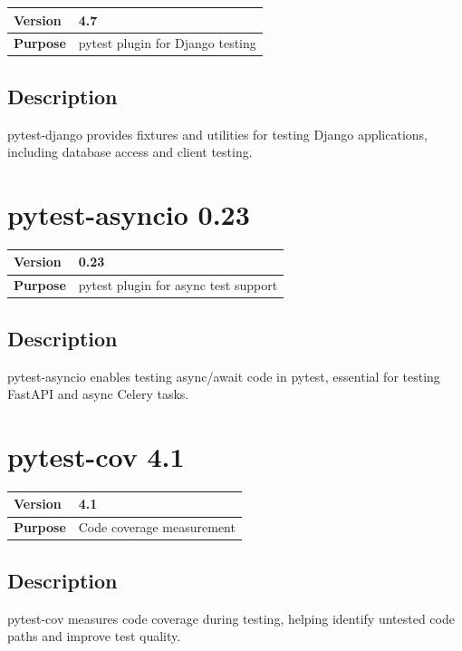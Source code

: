 \documentclass[12pt,a4paper]{report}
\begin{document}
\begin{tabular}{|p{4cm}|p{10cm}|}
\hline
\textbf{Version} & 4.7 \\
\hline
\textbf{Purpose} & pytest plugin for Django testing \\
\hline
\end{tabular}

\subsection{Description}

pytest-django provides fixtures and utilities for testing Django applications, including database access and client testing.

\section{pytest-asyncio 0.23}

\begin{tabular}{|p{4cm}|p{10cm}|}
\hline
\textbf{Version} & 0.23 \\
\hline
\textbf{Purpose} & pytest plugin for async test support \\
\hline
\end{tabular}

\subsection{Description}

pytest-asyncio enables testing async/await code in pytest, essential for testing FastAPI and async Celery tasks.

\section{pytest-cov 4.1}

\begin{tabular}{|p{4cm}|p{10cm}|}
\hline
\textbf{Version} & 4.1 \\
\hline
\textbf{Purpose} & Code coverage measurement \\
\hline
\end{tabular}

\subsection{Description}

pytest-cov measures code coverage during testing, helping identify untested code paths and improve test quality.
\end{document}
